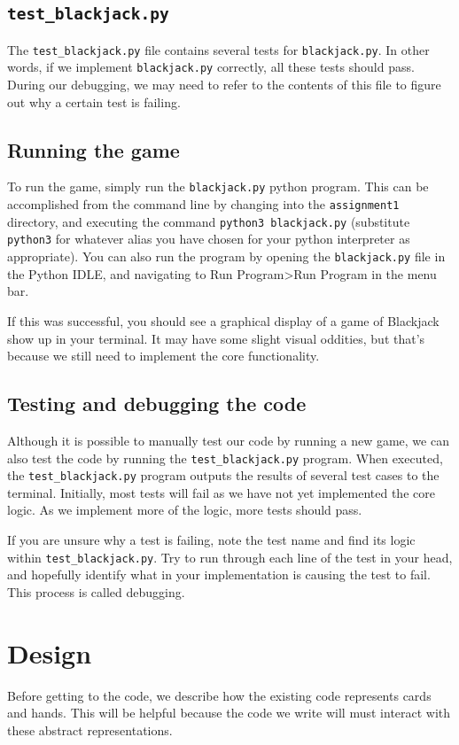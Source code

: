 \documentclass{article}
\begin{document}
\subsection{\texttt{test\_blackjack.py}}
The \texttt{test\_blackjack.py} file contains several tests for \texttt{blackjack.py}. In other words, if we implement \texttt{blackjack.py} correctly, all these tests should pass. During our debugging, we may need to refer to the contents of this file to figure out why a certain test is failing.

\subsection{Running the game}
To run the game, simply run the \texttt{blackjack.py} python program. This can be accomplished from the command line by changing into the \texttt{assignment1} directory, and executing the command \texttt{python3 blackjack.py} (substitute \texttt{python3} for whatever alias you have chosen for your python interpreter as appropriate). You can also run the program by opening the \texttt{blackjack.py} file in the Python IDLE, and navigating to Run Program\textgreater Run Program in the menu bar. 

If this was successful, you should see a graphical display of a game of Blackjack show up in your terminal. It may have some slight visual oddities, but that's because we still need to implement the core functionality.

\subsection{Testing and debugging the code}
Although it is possible to manually test our code by running a new game, we can also test the code by running the \texttt{test\_blackjack.py} program. When executed, the \texttt{test\_blackjack.py} program outputs the results of several test cases to the terminal. Initially, most tests will fail as we have not yet implemented the core logic. As we implement more of the logic, more tests should pass.

If you are unsure why a test is failing, note the test name and find its logic within \texttt{test\_blackjack.py}. Try to run through each line of the test in your head, and hopefully identify what in your implementation is causing the test to fail. This process is called debugging. 


\section{Design}
Before getting to the code, we describe how the existing code represents cards and hands. This will be helpful because the code we write will must interact with these abstract representations.
\end{document}
